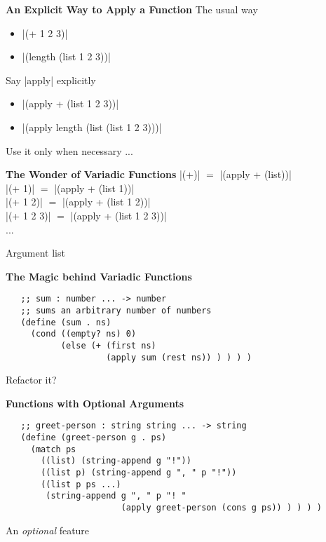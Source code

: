 \documentclass[12pt]{beamer}
\begin{document}
\begin{frame}[fragile]{\bf An Explicit Way to Apply a Function}
 The usual way
 \begin{itemize}
  \item {}|(+ 1 2 3)|
  \item {}|(length (list 1 2 3))|
 \end{itemize}

 \pause

 Say |apply| explicitly
 \begin{itemize}
  \item {}|(apply + (list 1 2 3))|
  \pause
  \item {}|(apply length (list (list 1 2 3)))|
 \end{itemize}

 Use it only when necessary ...
\end{frame}

\begin{frame}[fragile]{\bf The Wonder of Variadic Functions}
 |(+)| $=$ |(apply + (list))| \\
 \pause
 |(+ 1)| $=$ |(apply + (list 1))| \\
 \pause
 |(+ 1 2)| $=$ |(apply + (list 1 2))| \\
 \pause
 |(+ 1 2 3)| $=$ |(apply + (list 1 2 3))| \\
 ... 

 \pause
 Argument list
\end{frame}

\begin{frame}[fragile]{\bf The Magic behind Variadic Functions}\
 {\footnotesize
  \begin{verbatim}
   ;; sum : number ... -> number
   ;; sums an arbitrary number of numbers
   (define (sum . ns)
     (cond ((empty? ns) 0)
           (else (+ (first ns)
                    (apply sum (rest ns)) ) ) ) )
  \end{verbatim}
 } 

 \pause
 Refactor it?
\end{frame}

\begin{frame}[fragile]{\bf Functions with Optional Arguments}\
 {\footnotesize
  \begin{verbatim}
   ;; greet-person : string string ... -> string
   (define (greet-person g . ps)
     (match ps
       ((list) (string-append g "!"))
       ((list p) (string-append g ", " p "!"))
       ((list p ps ...)
        (string-append g ", " p "! "
                       (apply greet-person (cons g ps)) ) ) ) )
  \end{verbatim}
 }

 \pause

 An \emph{optional} feature
\end{frame}
\end{document}
